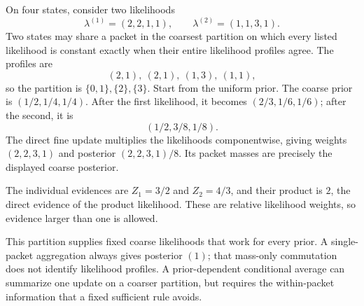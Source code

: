 On four states, consider two likelihoods
\[
\lambda^{(1)}=(2,2,1,1),\qquad
\lambda^{(2)}=(1,1,3,1).
\]
Two states may share a packet in the coarsest partition on which every listed likelihood is constant exactly when their entire likelihood profiles agree. The profiles are
\[
(2,1),\ (2,1),\ (1,3),\ (1,1),
\]
so the partition is $\{0,1\},\{2\},\{3\}$.
Start from the uniform prior. The coarse prior is $(1/2,1/4,1/4)$. After the first likelihood, it becomes $(2/3,1/6,1/6)$; after the second, it is
\[
(1/2,3/8,1/8).
\]
The direct fine update multiplies the likelihoods componentwise, giving weights $(2,2,3,1)$ and posterior $(2,2,3,1)/8$. Its packet masses are precisely the displayed coarse posterior.

The individual evidences are $Z_1=3/2$ and $Z_2=4/3$, and their product is $2$, the direct evidence of the product likelihood. These are relative likelihood weights, so evidence larger than one is allowed.

This partition supplies fixed coarse likelihoods that work for every prior. A single-packet aggregation always gives posterior $(1)$; that mass-only commutation does not identify likelihood profiles. A prior-dependent conditional average can summarize one update on a coarser partition, but requires the within-packet information that a fixed sufficient rule avoids.

